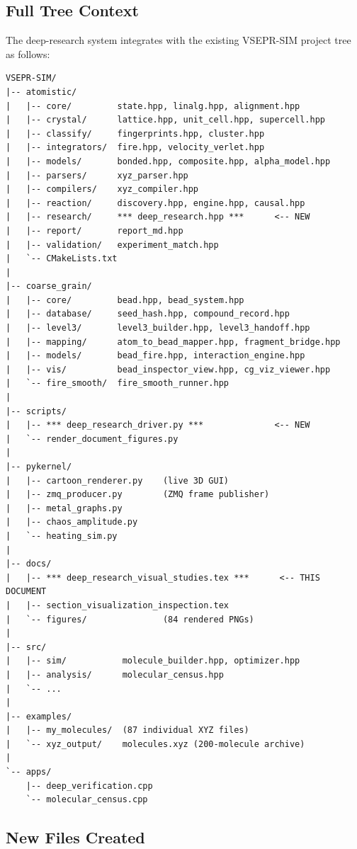 \documentclass[11pt,a4paper]{article}
\begin{document}
\subsection{Full Tree Context}

The deep-research system integrates with the existing VSEPR-SIM
project tree as follows:

\begin{lstlisting}[title={\textbf{Project tree (deep-research additions highlighted)}}]
VSEPR-SIM/
|-- atomistic/
|   |-- core/         state.hpp, linalg.hpp, alignment.hpp
|   |-- crystal/      lattice.hpp, unit_cell.hpp, supercell.hpp
|   |-- classify/     fingerprints.hpp, cluster.hpp
|   |-- integrators/  fire.hpp, velocity_verlet.hpp
|   |-- models/       bonded.hpp, composite.hpp, alpha_model.hpp
|   |-- parsers/      xyz_parser.hpp
|   |-- compilers/    xyz_compiler.hpp
|   |-- reaction/     discovery.hpp, engine.hpp, causal.hpp
|   |-- research/     *** deep_research.hpp ***      <-- NEW
|   |-- report/       report_md.hpp
|   |-- validation/   experiment_match.hpp
|   `-- CMakeLists.txt
|
|-- coarse_grain/
|   |-- core/         bead.hpp, bead_system.hpp
|   |-- database/     seed_hash.hpp, compound_record.hpp
|   |-- level3/       level3_builder.hpp, level3_handoff.hpp
|   |-- mapping/      atom_to_bead_mapper.hpp, fragment_bridge.hpp
|   |-- models/       bead_fire.hpp, interaction_engine.hpp
|   |-- vis/          bead_inspector_view.hpp, cg_viz_viewer.hpp
|   `-- fire_smooth/  fire_smooth_runner.hpp
|
|-- scripts/
|   |-- *** deep_research_driver.py ***              <-- NEW
|   `-- render_document_figures.py
|
|-- pykernel/
|   |-- cartoon_renderer.py    (live 3D GUI)
|   |-- zmq_producer.py        (ZMQ frame publisher)
|   |-- metal_graphs.py
|   |-- chaos_amplitude.py
|   `-- heating_sim.py
|
|-- docs/
|   |-- *** deep_research_visual_studies.tex ***      <-- THIS DOCUMENT
|   |-- section_visualization_inspection.tex
|   `-- figures/               (84 rendered PNGs)
|
|-- src/
|   |-- sim/           molecule_builder.hpp, optimizer.hpp
|   |-- analysis/      molecular_census.hpp
|   `-- ...
|
|-- examples/
|   |-- my_molecules/  (87 individual XYZ files)
|   `-- xyz_output/    molecules.xyz (200-molecule archive)
|
`-- apps/
    |-- deep_verification.cpp
    `-- molecular_census.cpp
\end{lstlisting}

\subsection{New Files Created}
\end{document}
